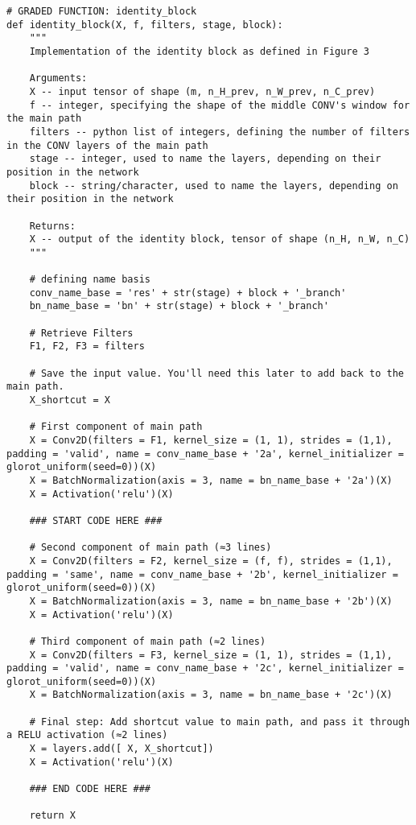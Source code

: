 \begin{verbatim}
# GRADED FUNCTION: identity_block
def identity_block(X, f, filters, stage, block):
    """
    Implementation of the identity block as defined in Figure 3
    
    Arguments:
    X -- input tensor of shape (m, n_H_prev, n_W_prev, n_C_prev)
    f -- integer, specifying the shape of the middle CONV's window for the main path
    filters -- python list of integers, defining the number of filters in the CONV layers of the main path
    stage -- integer, used to name the layers, depending on their position in the network
    block -- string/character, used to name the layers, depending on their position in the network
    
    Returns:
    X -- output of the identity block, tensor of shape (n_H, n_W, n_C)
    """
    
    # defining name basis
    conv_name_base = 'res' + str(stage) + block + '_branch'
    bn_name_base = 'bn' + str(stage) + block + '_branch'
    
    # Retrieve Filters
    F1, F2, F3 = filters
    
    # Save the input value. You'll need this later to add back to the main path. 
    X_shortcut = X
    
    # First component of main path
    X = Conv2D(filters = F1, kernel_size = (1, 1), strides = (1,1), padding = 'valid', name = conv_name_base + '2a', kernel_initializer = glorot_uniform(seed=0))(X)
    X = BatchNormalization(axis = 3, name = bn_name_base + '2a')(X)
    X = Activation('relu')(X)
    
    ### START CODE HERE ###
    
    # Second component of main path (≈3 lines)
    X = Conv2D(filters = F2, kernel_size = (f, f), strides = (1,1), padding = 'same', name = conv_name_base + '2b', kernel_initializer = glorot_uniform(seed=0))(X)
    X = BatchNormalization(axis = 3, name = bn_name_base + '2b')(X)
    X = Activation('relu')(X)

    # Third component of main path (≈2 lines)
    X = Conv2D(filters = F3, kernel_size = (1, 1), strides = (1,1), padding = 'valid', name = conv_name_base + '2c', kernel_initializer = glorot_uniform(seed=0))(X)
    X = BatchNormalization(axis = 3, name = bn_name_base + '2c')(X)

    # Final step: Add shortcut value to main path, and pass it through a RELU activation (≈2 lines)
    X = layers.add([ X, X_shortcut])
    X = Activation('relu')(X)
    
    ### END CODE HERE ###
    
    return X
\end{verbatim}




